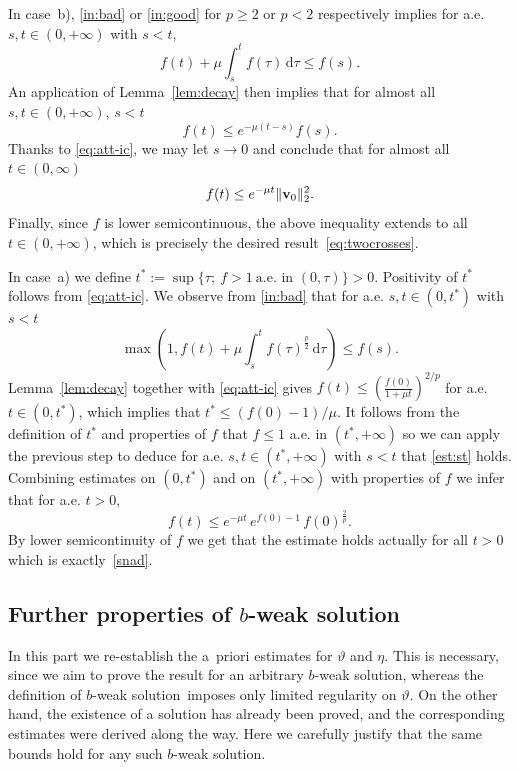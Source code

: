 \documentclass[11pt, a4paper, reqno]{amsart}
\numberwithin{equation}{section}
\newcommand{\vc}[1]{{\bf #1}}
\newcommand{\vv}{\vc{v}}
\newcommand{\thet}{\vartheta}
\newcommand{\tstar}{t^*}
\newcommand{\bb}{b}
\newcommand{\bws}{$\bb$-weak solution}
\begin{document}
In case~b), \eqref{in:bad} or \eqref{in:good} for $p\geq 2$ or $p<2$ respectively  implies for a.e. $s, t\in(0,+\infty)$ with $s<t$,
$$
f(t) + \mu\int_s^t f(\tau)\,\mathrm{d}\tau \leq f(s).
$$
An application of Lemma~\ref{lem:decay} then implies that for almost all $s,t\in(0,+\infty)$, $s<t$
\begin{equation}\label{est:st}
f(t)\le e^{-\mu(t-s)}f(s).
\end{equation}
Thanks to \eqref{eq:att-ic}, we may let $s\to 0$ and conclude that for almost all $t\in (0,\infty)$
$$
f(t)\le e^{-\mu t}\|\vv_0\|_2^2.
$$
Finally, since $f$ is lower semicontinuous, the above inequality extends to all $t\in (0,+\infty)$, which is precisely the desired result~\eqref{eq:twocrosses}.



In case~a) we define $\tstar:=\sup\{\tau;\ f>1 \ \text{a.e. in } (0,\tau)\}>0$. Positivity of $t^*$ follows from \eqref{eq:att-ic}. We observe from \eqref{in:bad} that for a.e. $s,t\in(0,t^*)$ with $s<t$
$$
\max(1,f(t) + \mu\int_s^t f(\tau)^{\frac p2}\,\mathrm{d}\tau) \leq f(s).
$$
Lemma~\ref{lem:decay} together with \eqref{eq:att-ic} gives $f(t)\leq \left(\frac{f(0)}{1+\mu t}\right)^{2/p}$ for a.e. $t\in(0,\tstar)$, which implies that $\tstar\leq (f(0)-1)/\mu$.
It follows from the definition of $\tstar$ and properties of $f$ that $f\le 1$ a.e. in $(\tstar,+\infty)$ so we can apply the previous step to deduce for a.e. $s,t\in(\tstar,+\infty)$ with $s<t$ that \eqref{est:st} holds.
Combining estimates on $(0,\tstar)$ and on $(\tstar,+\infty)$ with properties of $f$ we infer that for a.e. $t>0$,
$$
f(t)%
\leq e^{-\mu t}\, e^{f(0)-1}\, f(0)^{\frac2p}.
$$
By lower semicontinuity of $f$ we get that the estimate holds actually for all $t>0$ which is exactly~\eqref{snad}.

\subsection{Further properties of \texorpdfstring{\bws}{b}}
In this part we re-establish the a~priori estimates for $\thet$ and $\eta$. 
This is necessary, since we aim to prove the result for an arbitrary \bws, whereas the definition of \bws\ imposes only limited regularity on $\thet$. 
On the other hand, the existence of a solution has already been proved, and the corresponding estimates were derived along the way. 
Here we carefully justify that the same bounds hold for any such \bws.
\end{document}
